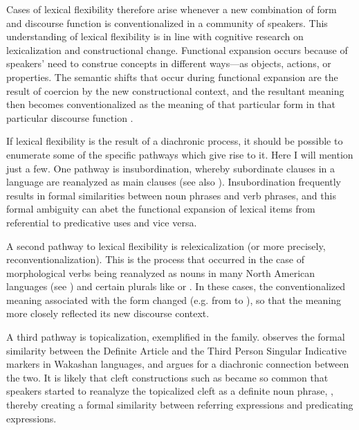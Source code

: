 \noindent Cases of lexical flexibility therefore arise whenever a new combination of form and discourse function is conventionalized in a community of speakers. This understanding of lexical flexibility is in line with cognitive research on lexicalization and constructional change. Functional expansion occurs because of speakers' need to construe concepts in different ways—as objects, actions, or properties. The semantic shifts that occur during functional expansion are the result of coercion by the new constructional context, and the resultant meaning then becomes conventionalized as the meaning of that particular form in that particular discourse function \parencite[108]{Croft1991}.

If lexical flexibility is the result of a diachronic process, it should be possible to enumerate some of the specific pathways which give rise to it. Here I will mention just a few. One pathway is insubordination, whereby subordinate clauses in a language are reanalyzed as main clauses \parencites{Evans2007}{Mithun2008}{EvansWatanabe2016} (see also ). Insubordination frequently results in formal similarities between noun phrases and verb phrases, and this formal ambiguity can abet the functional expansion of lexical items from referential to predicative uses and vice versa.

A second pathway to lexical flexibility is relexicalization (or more precisely, reconventionalization). This is the process that occurred in the case of morphological verbs being reanalyzed as nouns in many North American languages (see ) and certain  plurals like  or . In these cases, the conventionalized meaning associated with the form changed (e.g. from   to ), so that the meaning more closely reflected its new discourse context.

A third pathway is topicalization, exemplified in the  family. \textcite[122, 142]{Jacobsen1979} observes the formal similarity between the Definite Article and the Third Person Singular Indicative markers in Wakashan languages, and argues for a diachronic connection between the two. It is likely that cleft constructions such as  became so common that speakers started to reanalyze the topicalized cleft as a definite noun phrase, , thereby creating a formal similarity between referring expressions and predicating expressions.

